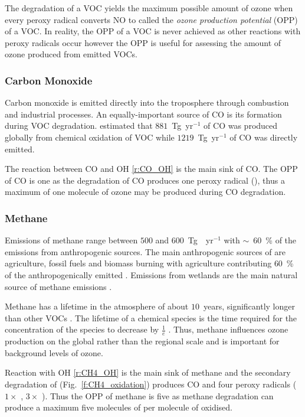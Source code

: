 The degradation of a VOC yields the maximum possible amount of ozone when every peroxy radical converts NO to  called the \emph{ozone production potential} (OPP) of a VOC.
In reality, the OPP of a VOC is never achieved as other reactions with peroxy radicals occur however the OPP is useful for assessing the amount of ozone produced from emitted VOCs.

\subsubsection{Carbon Monoxide}
Carbon monoxide is emitted directly into the troposphere through combustion and industrial processes.
An equally-important source of CO is its formation during VOC degradation.
\citet{Hauglustaine:1998} estimated that $881$~Tg~yr$^{-1}$ of CO was produced globally from chemical oxidation of VOC while $1219$~Tg~yr$^{-1}$ of CO was directly emitted.

The reaction between CO and OH \eqref{r:CO_OH} is the main sink of CO.
The OPP of CO is one as the degradation of CO produces one peroxy radical (), thus a maximum of one molecule of ozone may be produced during CO degradation.

\subsubsection{Methane}
Emissions of methane range between $500$ and $600$~Tg~~yr$^{-1}$ with $\sim$~$60$~\% of the emissions from anthropogenic sources.
The main anthropogenic sources of  are agriculture, fossil fuels and biomass burning with agriculture contributing $60$~\% of the anthropogenically emitted .
Emissions from wetlands are the main natural source of methane emissions \citep{Kirschke:2013}.

Methane has a lifetime in the atmosphere of about $10$~years, significantly longer than other VOCs \citep{Voulgarakis:2013}.
The lifetime of a chemical species is the time required for the concentration of the species to decrease by $\frac{1}{e}$ \citep{Seinfeld:2006}.
Thus, methane influences ozone production on the global rather than the regional scale and is important for background levels of ozone.  

Reaction with OH \eqref{r:CH4_OH} is the main sink of methane and the secondary degradation of  (Fig.~\ref{f:CH4_oxidation}) produces CO and four peroxy radicals ($1 \times$ , $3 \times$ ).
Thus the OPP of methane is five as methane degradation can produce a maximum five molecules of  per molecule of  oxidised. 

